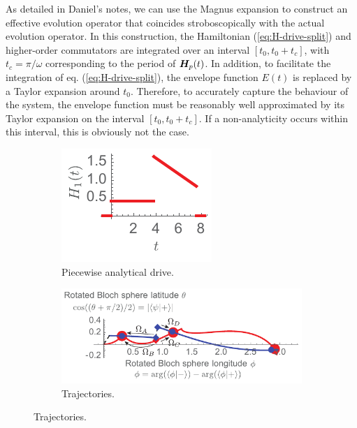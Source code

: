 As detailed in Daniel's notes, we can use the Magnus expansion to construct an effective evolution operator that coincides stroboscopically with the actual evolution operator. In this construction, the Hamiltonian (\ref{eq:H-drive-split}) and higher-order commutators are integrated over an interval $[t_0, t_0+t_c]$, with $t_c = \pi / \omega$ corresponding to the period of $\bm{H}_p(t)$. In addition, to facilitate the integration of eq. (\ref{eq:H-drive-split}), the envelope function $E(t)$ is replaced by a Taylor expansion around $t_0$. Therefore, to accurately capture the behaviour of the system, the envelope function must be reasonably well approximated by its Taylor expansion on the interval $[t_0, t_0+t_c]$. If a non-analyticity occurs within this interval, this is obviously not the case. 

\begin{figure}[tb]
	\centering
	\begin{subfigure}[b]{0.3\linewidth}
		\centering
		\includegraphics[scale=1]{figures/jumpop_drive.pdf}
		\caption{\label{fig:jumpop-trace:drive}Piecewise analytical drive.}
	\end{subfigure}%
	\begin{subfigure}[b]{0.7\linewidth}
		\centering
		\includegraphics[scale=1]{figures/jumpop_trace.pdf}
		\caption{\label{fig:jumpop-trace:trajectory}Trajectories.}
	\end{subfigure}%

\end{figure}
